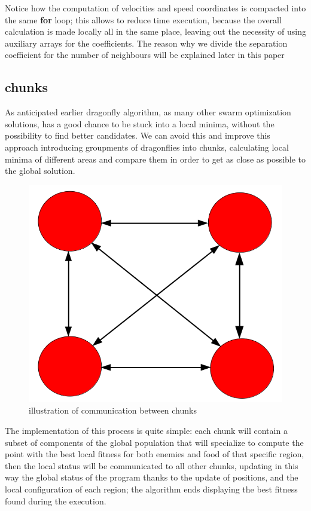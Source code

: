 \documentclass[10pt]{article}
\begin{document}
\begin{multicols}{2}
\noindent Notice how the computation
of velocities and speed coordinates is compacted into the same \textbf{for} loop;
this allows to reduce time execution, because the overall calculation is made locally
all in the same place, leaving out the necessity of using auxiliary arrays for the coefficients.
The reason why we divide the separation coefficient for the number of neighbours 
will be explained later in this paper

\subsection*{chunks}

As anticipated earlier dragonfly algorithm, as many other swarm optimization solutions,
has a good chance to be stuck into a local minima, without the possibility to find better
candidates. We can avoid this and improve this approach introducing groupments of dragonflies into chunks, 
calculating local minima of different areas and compare them in order
to get as close as possible to the global solution.  

\begin{figure}[H]
  \includegraphics[scale=0.3]{img/chunks.png}
  \centering
  \caption{illustration of communication between chunks}
\end{figure}

\noindent The implementation of this process is quite simple: each chunk will contain a subset
of components of the global population that will specialize to compute the point with the best local
fitness for both enemies and food of that specific region, then the local status will be communicated
to all other chunks, updating in this way the global status of the program thanks to the update of positions,
and the local configuration of each region; the algorithm ends displaying the best fitness found
during the execution.



\end{multicols}
\end{document}
